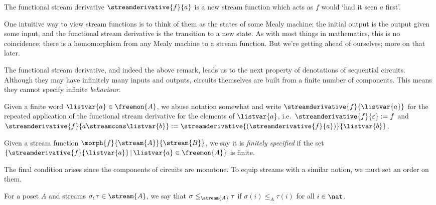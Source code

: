 The functional stream derivative \(\streamderivative{f}{a}\) is a new stream
function which acts as \(f\) would `had it seen \(a\) first'.

\begin{remark}
    One intuitive way to view stream functions is to think of them as the states
    of some Mealy machine; the initial output is the output given some input,
    and the functional stream derivative is the transition to a new state.
    As with most things in mathematics, this is no coincidence; there is a
    homomorphism from any Mealy machine to a stream function.
    But we're getting ahead of ourselves; more on that later.
\end{remark}

The functional stream derivative, and indeed the above remark, leads us to the
next property of denotations of sequential circuits.
Although they may have infinitely many inputs and outputs, circuits themselves
are built from a finite number of components.
This means they cannot specify infinite \emph{behaviour}.

\begin{notation}
    Given a finite word \(\listvar{a} \in \freemon{A}\), we abuse notation
    somewhat and write \(\streamderivative{f}{\listvar{a}}\) for the repeated
    application of the functional stream derivative for the elements of
    \(\listvar{a}\), i.e.\ \(
        \streamderivative{f}{\varepsilon} := f
    \) and \(
        \streamderivative{f}{a \streamcons \listvar{b}} :=
        \streamderivative{(\streamderivative{f}{a})}{\listvar{b}}
    \).
\end{notation}

\begin{definition}
    Given a stream function \(\morph{f}{\stream{A}}{\stream{B}}\), we say it is
    \emph{finitely specified} if the set \(\{
        \streamderivative{f}{\listvar{a}} \,|\, \listvar{a} \in \freemon{A}
    \}\) is finite.
\end{definition}

The final condition arises since the components of circuits are monotone.
To equip streams with a similar notion, we must set an order on them.

\begin{notation}
    For a poset \(A\) and streams \(\sigma,\tau \in \stream{A}\), we say that
    \(\sigma \leq_{\stream{A}} \tau\) if \(\sigma(i) \leq_A \tau(i)\) for all
    \(i \in \nat\).
\end{notation}

